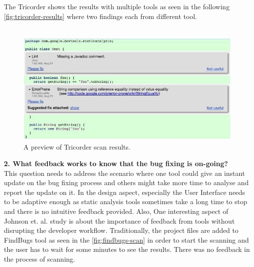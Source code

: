 \clearpage

The Tricorder shows the results with multiple tools as seen in the following \autoref{fig:tricorder-results} where two findings each from different tool. \\ \\

\begin{figure}[hbt!]
	\centering
	\includegraphics[width=\linewidth]{figures/Tricorder}
	\caption{A preview of Tricorder scan results. \cite{tricorder}}
	\label{fig:tricorder-results}
\end{figure}

\textbf{2. What feedback works to know that the bug fixing is on-going?} \\

This question needs to address the scenario where one tool could give an instant update on the bug fixing process and others might take more time to analyse and report the update on it. In the design aspect, especially the User Interface needs to be adaptive \cite{NB18} enough as static analysis tools sometimes take a long time to stop and there is no intuitive feedback provided. Also, One interesting aspect of Johnson et. al. \cite{JSMB13} study is about the importance of feedback from tools without disrupting the developer workflow. Traditionally, the project files are added to FindBugs \cite{findbugs} tool as seen in the \autoref{fig:findbugs-scan} in order to start the scanning and the user has to wait for some minutes to see the results. There was no feedback in the process of scanning. \\ \\

